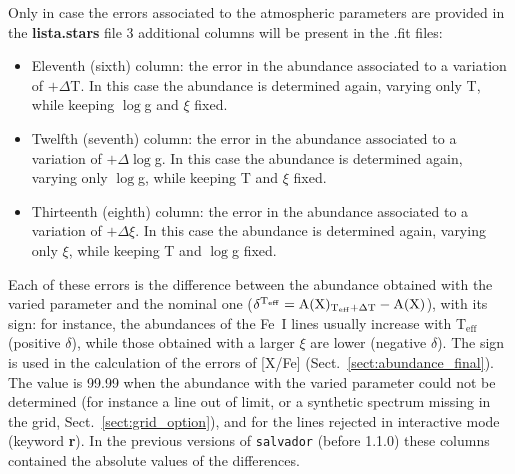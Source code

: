 \documentclass[modern]{aastex701}
\begin{document}
Only in case the errors associated to the atmospheric parameters are provided in the \textbf{lista.stars} file 3 additional columns will be present in the .fit files:
\begin{itemize}
    \item Eleventh (sixth) column: the error in the abundance associated to a variation of $+\Delta$T. In this case the abundance is determined again, varying only T, while keeping $\log$g and $\xi$ fixed.
    \item Twelfth (seventh) column: the error in the abundance associated to a variation of $+\Delta \log$g. In this case the abundance is determined again, varying only $\log$g, while keeping T and $\xi$ fixed.
    \item Thirteenth (eighth) column: the error in the abundance associated to a variation of $+\Delta \xi$. In this case the abundance is determined again, varying only $\xi$, while keeping T and $\log$g fixed.
\end{itemize}
Each of these errors is the difference between the abundance obtained with the varied parameter and the nominal one ($\rm \delta^{T_{eff}} = A(X)_{T_{eff}+\Delta T} - A(X)$), with its sign: for instance, the abundances of the Fe~I lines usually increase with T$_{\mathrm{eff}}$ (positive $\delta$), while those obtained with a larger $\xi$ are lower (negative $\delta$). The sign is used in the calculation of the errors of [X/Fe] (Sect.~\ref{sect:abundance_final}). The value is 99.99 when the abundance with the varied parameter could not be determined (for instance a line out of limit, or a synthetic spectrum missing in the grid, Sect.~\ref{sect:grid_option}), and for the lines rejected in interactive mode (keyword {\bf r}). In the previous versions of \texttt{salvador} (before 1.1.0) these columns contained the absolute values of the differences.
\end{document}
